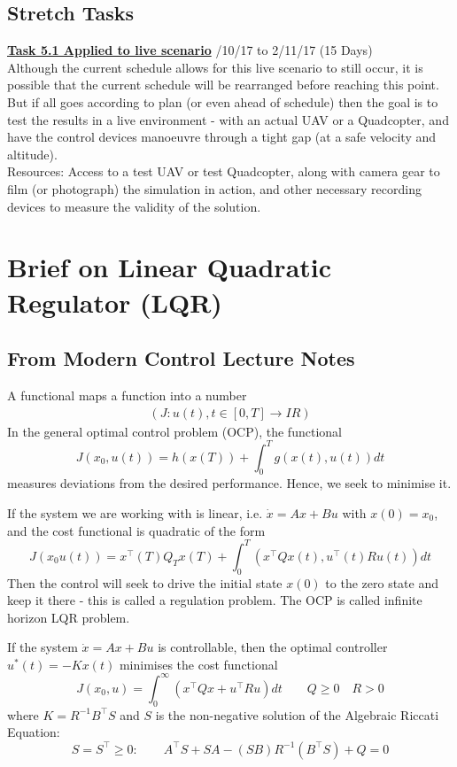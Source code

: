 \documentclass[11pt,draftd]{article}
\def\Real{I\!R}
\begin{document}
\begin{appendices}
	\subsection{Stretch Tasks}
	\underline{\textbf{Task 5.1 Applied to live scenario}} /10/17 to 2/11/17 (15 Days) \\
	
	\noindent Although the current schedule allows for this live scenario to still occur, it is possible that the current schedule will be rearranged before reaching this point. But if all goes according to plan (or even ahead of schedule) then the goal is to test the results in a live environment - with an actual UAV or a Quadcopter, and have the control devices manoeuvre through a tight gap (at a safe velocity and altitude). \\
	Resources: Access to a test UAV or test Quadcopter, along with camera gear to film (or photograph) the simulation in action, and other necessary recording devices to measure the validity of the solution. 
	\newpage
	
	\section{Brief on Linear Quadratic Regulator (LQR)}\label{app_itemC}
	\subsection{From Modern Control Lecture Notes}
	A functional maps a function into a number
	\begin{align}
	(J:u(t),t\in[0,T]\rightarrow \Real)
	\end{align}
	In the general optimal control problem (OCP), the functional 
	\[ J(x_{0},u(t)) = h(x(T)) + \int_{0}^{T}g(x(t),u(t))dt\]
	measures deviations from the desired performance. Hence, we seek to minimise it.
	
	If the system we are working with is linear, i.e. $ \dot{x} = Ax + Bu$ with $ x(0) = x_{0} $, and the cost functional is quadratic of the form
	\begin{equation}
	J(x_{0}u(t)) = x^{\intercal}(T)Q_{T}x(T) + \int_{0}^{T}(x^{\intercal}Qx(t), u^{\intercal}(t)Ru(t))dt
	\end{equation}
	Then the control will seek to drive the initial state $ x(0) $ to the zero state and keep it there - this is called a regulation problem. The OCP is called infinite horizon LQR problem.
	
	If the system $ \dot{x} = Ax + Bu$ is controllable, then the optimal controller $ u^{*}(t) = -Kx(t) $ minimises the cost functional
	\begin{equation}
	J(x_{0},u) = \int_{0}^{\infty} (x^{\intercal}Qx + u^{\intercal}Ru)dt \qquad Q\ge 0 \quad R > 0
	\end{equation}
	where $ K = R^{-1}B^{\intercal}S $ and $ S $ is the non-negative solution of the Algebraic Riccati Equation:
	\begin{equation}
	S = S^{\intercal}\ge 0: \qquad A^{\intercal}S + SA - (SB)R^{-1}(B^{\intercal}S) + Q = 0
	\end{equation}
	

\end{appendices}
\end{document}
